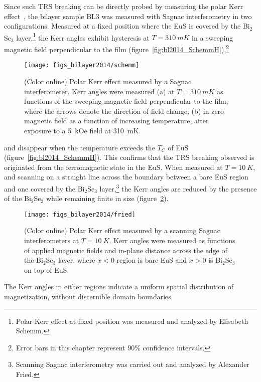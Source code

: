 Since such TRS breaking can be directly probed by measuring the polar Kerr effect~\cite{Xia2006}, the bilayer sample BL3 was measured with Sagnac interferometry in two configurations. Measured at a fixed position where the EuS is covered by the Bi$_2$Se$_3$ layer,\footnote{Polar Kerr effect at fixed position was measured and analyzed by Elisabeth Schemm.} the Kerr angles exhibit hysteresis at $T=\SI{310}{mK}$ in a sweeping magnetic field perpendicular to the film (figure~\ref{fig:bl2014_SchemmH}),\footnote{Error bars in this chapter represent 90\% confidence intervals.}%
%
\begin{figure}[ht]%
\centering%
\subfloat{\label{fig:bl2014_SchemmT}}%
\subfloat{\label{fig:bl2014_SchemmH}}%
\texttt{[image: figs\_bilayer2014/schemm]}
\caption[Polar Kerr effect in Bi$_2$Se$_3$--EuS bilayers]{\label{fig:bl2014_schemm}(Color online) Polar Kerr effect measured by a Sagnac interferometer. Kerr angles were measured (a) at $T=\SI{310}{mK}$ as functions of the sweeping magnetic field perpendicular to the film, where the arrows denote the direction of field change; (b) in zero magnetic field as a function of increasing temperature, after exposure to a 5~kOe field at \SI{310}{mK}.}%
\end{figure} %
%
and disappear when the temperature exceeds the $T_C$ of EuS (figure~\ref{fig:bl2014_SchemmH}). This confirms that the TRS breaking observed is originated from the ferromagnetic state in the EuS. When measured at $T=\SI{10}{K}$, and scanning on a straight line across the boundary between a bare EuS region and one covered by the Bi$_2$Se$_3$ layer,\footnote{Scanning Sagnac interferometry was carried out and analyzed by Alexander Fried.} the Kerr angles are reduced by the presence of the Bi$_2$Se$_3$ while remaining finite in size (figure~\ref{fig:bl2014_Fried}).%
%
\begin{figure}[ht]%
\centering%
\texttt{[image: figs\_bilayer2014/fried]}
\caption[Scanning polar Kerr effect measurements on a Bi$_2$Se$_3$--EuS bilayer]{\label{fig:bl2014_Fried}(Color online) Polar Kerr effect measured by a scanning Sagnac interferometers at $T=\SI{10}{K}$. Kerr angles were measured as functions of applied magnetic fields and in-plane distance across the edge of the Bi$_2$Se$_3$ layer, where $x<0$ region is bare EuS and $x>0$ is Bi$_2$Se$_3$ on top of EuS.}%
\end{figure} %
The Kerr angles in either regions indicate a uniform spatial distribution of magnetization, without discernible domain boundaries.

